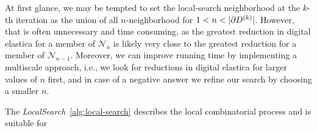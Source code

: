 At first glance, we may be tempted to set the local-search neighborhood at the $k$-th iteration as the union of all $n$-neighborhood for $1<n<|\partial \Ds^{(k)}|$. However, that is often unnecessary and time consuming, as the greatest reduction in digital elastica for a member of $\mathcal{N}_n$ is likely very close to the greatest reduction for a member of $\mathcal{N}_{n-1}$. Moreover, we can improve running time by implementing a multiscale approach, i.e., we look for reductions in digital elastica for larger values of $n$ first, and in case of a negative answer we refine our search by choosing a smaller $n$.

The \emph{LocalSearch}~\cref{alg:local-search} describes the local combinatorial process and is suitable for  

	


